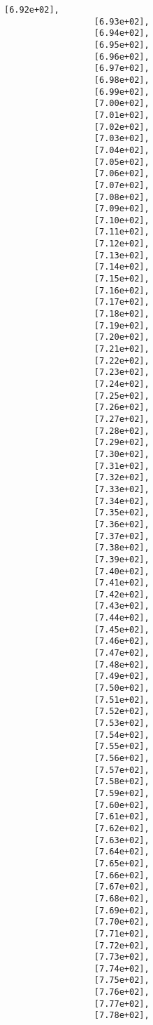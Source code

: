 \documentclass[11pt]{article}
\begin{document}
\begin{Verbatim}[commandchars=\\\{\}]
                  [6.92e+02],
                  [6.93e+02],
                  [6.94e+02],
                  [6.95e+02],
                  [6.96e+02],
                  [6.97e+02],
                  [6.98e+02],
                  [6.99e+02],
                  [7.00e+02],
                  [7.01e+02],
                  [7.02e+02],
                  [7.03e+02],
                  [7.04e+02],
                  [7.05e+02],
                  [7.06e+02],
                  [7.07e+02],
                  [7.08e+02],
                  [7.09e+02],
                  [7.10e+02],
                  [7.11e+02],
                  [7.12e+02],
                  [7.13e+02],
                  [7.14e+02],
                  [7.15e+02],
                  [7.16e+02],
                  [7.17e+02],
                  [7.18e+02],
                  [7.19e+02],
                  [7.20e+02],
                  [7.21e+02],
                  [7.22e+02],
                  [7.23e+02],
                  [7.24e+02],
                  [7.25e+02],
                  [7.26e+02],
                  [7.27e+02],
                  [7.28e+02],
                  [7.29e+02],
                  [7.30e+02],
                  [7.31e+02],
                  [7.32e+02],
                  [7.33e+02],
                  [7.34e+02],
                  [7.35e+02],
                  [7.36e+02],
                  [7.37e+02],
                  [7.38e+02],
                  [7.39e+02],
                  [7.40e+02],
                  [7.41e+02],
                  [7.42e+02],
                  [7.43e+02],
                  [7.44e+02],
                  [7.45e+02],
                  [7.46e+02],
                  [7.47e+02],
                  [7.48e+02],
                  [7.49e+02],
                  [7.50e+02],
                  [7.51e+02],
                  [7.52e+02],
                  [7.53e+02],
                  [7.54e+02],
                  [7.55e+02],
                  [7.56e+02],
                  [7.57e+02],
                  [7.58e+02],
                  [7.59e+02],
                  [7.60e+02],
                  [7.61e+02],
                  [7.62e+02],
                  [7.63e+02],
                  [7.64e+02],
                  [7.65e+02],
                  [7.66e+02],
                  [7.67e+02],
                  [7.68e+02],
                  [7.69e+02],
                  [7.70e+02],
                  [7.71e+02],
                  [7.72e+02],
                  [7.73e+02],
                  [7.74e+02],
                  [7.75e+02],
                  [7.76e+02],
                  [7.77e+02],
                  [7.78e+02],

\end{Verbatim}
\end{document}
